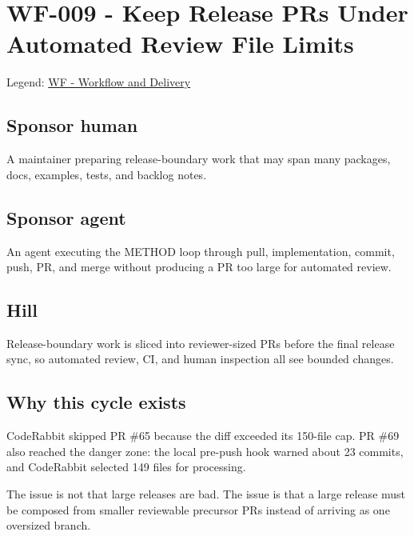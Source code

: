 \chapter{WF-009 - Keep Release PRs Under Automated Review File Limits}\label{record-205}

\smallskip

Legend: \href{https://github.com/flyingrobots/bijou/blob/1853ad902f6bf219326409e7f743a5a1d6517dbc/docs/legends/WF-workflow-and-delivery.md}{WF - Workflow and Delivery}

\section{Sponsor human}\label{record-205-sponsor-human}

A maintainer preparing release-boundary work that may span many packages, docs, examples, tests, and backlog notes.

\section{Sponsor agent}\label{record-205-sponsor-agent}

An agent executing the METHOD loop through pull, implementation, commit, push, PR, and merge without producing a PR too large for automated review.

\section{Hill}\label{record-205-hill}

Release-boundary work is sliced into reviewer-sized PRs before the final release sync, so automated review, CI, and human inspection all see bounded changes.

\section{Why this cycle exists}\label{record-205-why-this-cycle-exists}

CodeRabbit skipped PR \#65 because the diff exceeded its 150-file cap. PR \#69 also reached the danger zone: the local pre-push hook warned about 23 commits, and CodeRabbit selected 149 files for processing.

The issue is not that large releases are bad. The issue is that a large release must be composed from smaller reviewable precursor PRs instead of arriving as one oversized branch.

